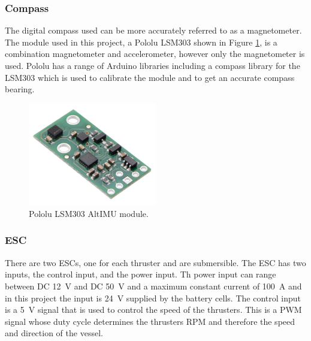 		\subsubsection{Compass}
		The digital compass used can be more accurately referred to as a magnetometer. The module used in this project, a  Pololu LSM303 shown in Figure \ref{fig:3:compass}, is a combination magnetometer and accelerometer, however only the magnetometer is used. Pololu has a range of Arduino libraries including a compass library for the LSM303 which is used to calibrate the module and to get an accurate compass bearing. 
		\begin{figure}[hb]
			\begin{center}
				\includegraphics[width = 0.5\textwidth]{figures/compass.jpg}
				\caption{Pololu LSM303 AltIMU module.}
				\label{fig:3:compass}
			\end{center}
		\end{figure}
		\subsubsection{ESC}
		There are two ESCs, one for each thruster and are submersible. The ESC has two inputs, the control input, and the power input. Th power input can range between DC \SI{12}{\volt} and DC \SI{50}{\volt} and a maximum constant current of \SI{100}{\ampere} and in this project the input is \SI{24}{\volt} supplied by the battery cells. The control input is a \SI{5}{\volt} signal that is used to control the speed of the thrusters. This is a PWM signal whose duty cycle determines the thrusters RPM and therefore the speed and direction of the vessel. 
